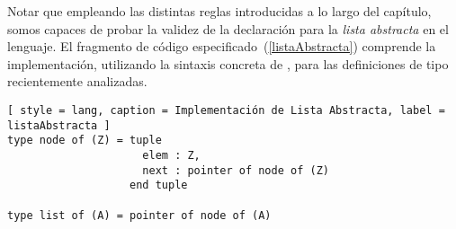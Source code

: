 Notar que empleando las distintas reglas introducidas a lo largo del capítulo, somos capaces de probar la validez de la declaración para la \textit{lista abstracta} en el lenguaje.
El fragmento de código especificado~(\ref{listaAbstracta}) comprende la implementación, utilizando la sintaxis concreta de \Lenguaje{}, para las definiciones de tipo recientemente analizadas.

\begin{lstlisting}[ style = lang, caption = Implementación de Lista Abstracta, label = listaAbstracta ]
type node of (Z) = tuple
                     elem : Z,
                     next : pointer of node of (Z)
                   end tuple

type list of (A) = pointer of node of (A)
\end{lstlisting}

